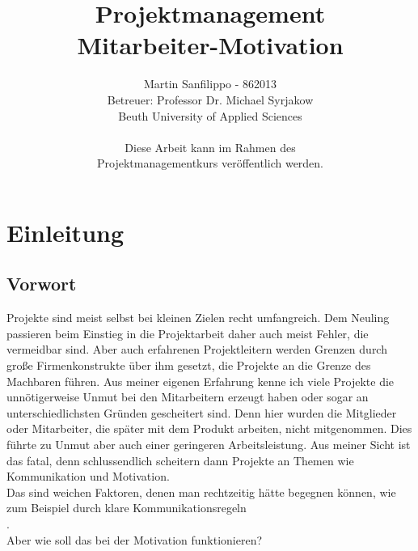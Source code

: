 \documentclass[12pt,a4paper]{scrreprt}
\author{Martin Sanfilippo - 862013 \\[1,0cm] Betreuer: Professor Dr. Michael Syrjakow\\Beuth University of Applied Sciences \\ \\ \small Diese Arbeit kann im Rahmen des\\ \small Projektmanagementkurs veröffentlich werden.}
\title{Projektmanagement\\ Mitarbeiter-Motivation}
\begin{document}
\large
\maketitle
\tableofcontents
\Large
\part{Einleitung}
\chapter{Vorwort}
\thispagestyle{fancy}
Projekte sind meist selbst bei kleinen Zielen recht umfangreich. Dem Neuling passieren beim Einstieg in die Projektarbeit daher auch meist Fehler, die vermeidbar sind. Aber auch erfahrenen Projektleitern werden Grenzen durch große Firmenkonstrukte über ihm gesetzt, die Projekte an die Grenze des Machbaren führen. Aus meiner eigenen Erfahrung kenne ich viele Projekte die unnötigerweise Unmut bei den Mitarbeitern erzeugt haben oder sogar an unterschiedlichsten Gründen gescheitert sind. Denn hier wurden die Mitglieder oder Mitarbeiter, die später mit dem Produkt arbeiten, nicht mitgenommen. Dies führte zu Unmut aber auch einer geringeren Arbeitsleistung. Aus meiner Sicht ist das fatal, denn schlussendlich scheitern dann Projekte an Themen wie Kommunikation und Motivation. \\
Das sind weichen Faktoren, denen man rechtzeitig hätte begegnen können, wie zum Beispiel durch klare Kommunikationsregeln\\  \cite[S. 78]{Braumandl2009}. \\Aber wie soll das bei der Motivation funktionieren?
\end{document}
